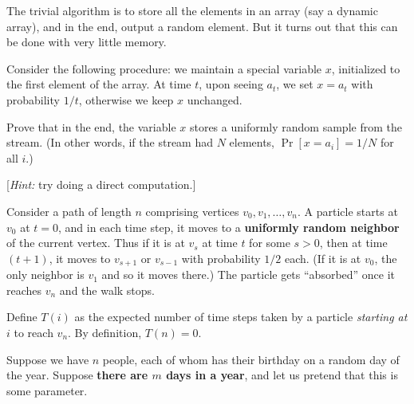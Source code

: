 \documentclass[addpoints, 11pt]{exam}
\begin{document}
\begin{questions}
The trivial algorithm is to store all the elements in an array (say a dynamic array), and in the end, output a random element. But it turns out that this can be done with very little memory. 

Consider the following procedure: we maintain a special variable $x$, initialized to the first element of the array. At time $t$, upon seeing $a_t$, we set $x = a_t$ with probability $1/t$, otherwise we keep $x$ unchanged. 

Prove that in the end, the variable $x$ stores a uniformly random sample from the stream. (In other words, if the stream had $N$ elements, $\Pr[ x= a_i] = 1/N$ for all $i$.)

[{\em Hint:} try doing a direct computation.]

Consider a path of length $n$ comprising vertices $v_0, v_1, \dots, v_n$.  A particle starts at $v_0$ at $t=0$, and in each time step, it moves to a {\bf uniformly random neighbor} of the current vertex. Thus if it is at $v_s$ at time $t$ for some $s>0$, then at time $(t+1)$, it moves to $v_{s+1}$ or $v_{s-1}$ with probability $1/2$ each. (If it is at $v_0$, the only neighbor is $v_1$ and so it moves there.) The particle gets ``absorbed'' once it reaches $v_n$ and the walk stops.

Define $T(i)$ as the expected number of time steps taken by a particle {\em starting at} $i$ to reach $v_n$. By definition, $T(n) =0$. 

Suppose we have $n$ people, each of whom has their birthday on a random day of the year. Suppose {\bf there are $m$ days in a year}, and let us pretend that this is some parameter. 


\end{questions}
\end{document}
